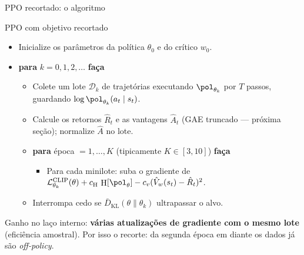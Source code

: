 \documentclass[aspectratio=169, 10pt]{beamer}
\newcommand{\thv}{\theta}
\newcommand{\thk}{\thv_k}
\newcommand{\polth}{\pol_{\thv}}
\newcommand{\Vhat}{\hat{V}}
\newcommand{\Ahat}{\hat{A}}
\DeclareMathOperator{\ent}{H}
\newcommand{\Lclip}{\mathcal{L}^{\mathrm{CLIP}}}
\newcommand{\Dtot}{\mathcal{D}}
\begin{document}
\begin{frame}{PPO recortado: o algoritmo}

  \begin{algbox}{PPO com objetivo recortado}
  \begin{itemize}\setlength{\itemsep}{0.1em}
    \item Inicialize os parâmetros da política $\thv_0$ e do crítico $w_0$.
    \item \textbf{para} $k = 0,1,2,\dots$ \textbf{faça}
      \begin{itemize}\setlength{\itemsep}{0.05em}
        \item Colete um lote $\Dtot_k$ de trajetórias executando $\pol_{\thk}$
          por $T$ passos, guardando $\log\pol_{\thk}(a_t\mid s_t)$.
        \item Calcule os retornos $\hat R_t$ e as vantagens $\Ahat_t$ (GAE
          truncado --- próxima seção); normalize $\Ahat$ no lote.
        \item \textbf{para} época $= 1,\dots,K$ (tipicamente $K \in [3,10]$) \textbf{faça}
          \begin{itemize}\setlength{\itemsep}{0.02em}
            \item Para cada minilote: suba o gradiente de
              $\Lclip_{\thk}(\thv) + c_{\ent}\,\ent[\polth] - c_v (\Vhat_w(s_t)-\hat R_t)^2$.
          \end{itemize}
        \item Interrompa cedo se $\bar{D}_{\mathrm{KL}}(\thv\|\thk)$ ultrapassar o alvo.
      \end{itemize}
  \end{itemize}
  \end{algbox}

  \begin{ideiabox}
    Ganho no laço interno: \textbf{várias atualizações de gradiente com o mesmo
    lote} (eficiência amostral). Por isso o recorte: da segunda época em diante os
    dados já são \emph{off-policy}.
  \end{ideiabox}
\end{frame}
\end{document}
